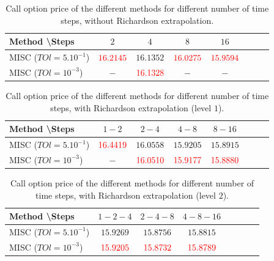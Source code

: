 \documentclass[11pt]{article}
\begin{document}
\begin{table}[h!]
	\centering
	\begin{tabular}{l*{6}{c}r}
		Method \textbackslash  Steps            & $2$ & $4$ & $8$ & $16$ &   \\
		\hline
		MISC ($TOl=5.10^{-1}$)  & ${\color{red}16.2145}$ & $16.1352$ & ${\color{red}16.0275}$ & ${\color{red}15.9594}$  \\
			MISC ($TOl=10^{-3}$)  & $-$ & $ {\color{red}16.1328 }$ & $-$ & $-$  \\
		\hline
	\end{tabular}
	\caption{ Call option price of the different methods for different number of time steps, without Richardson extrapolation.}
	\label{table: Call option price of the different methods for different number of time steps}
\end{table}


\begin{table}[h!]
	\centering
	\begin{tabular}{l*{6}{c}r}
		Method \textbackslash  Steps   &$1-2$         & $2-4$ & $4-8$ & $8-16$  \\
		\hline
		MISC ($TOl=5.10^{-1}$) & ${\color{red}16.4419}$ & $16.0558$ & $15.9205$ & $15.8915$   \\
		MISC ($TOl=10^{-3}$) & $-$ & ${\color{red}16.0510}$ & $ {\color{red}15.9177}$ & ${\color{red}15.8880}$   \\
		\hline
	\end{tabular}
	\caption{Call  option price of the different methods for different number of time steps, with Richardson extrapolation (level $1$).}
	\label{table: Call option price of the different methods for different number of time steps, binary option, with richardson, level 1}
\end{table}

\begin{table}[h!]
	\centering
	\begin{tabular}{l*{6}{c}r}
		Method \textbackslash  Steps   &$1-2-4$         & $2-4-8$ & $4-8-16$   \\
		\hline
		MISC ($TOl=5.10^{-1}$) & $15.9269$ & $15.8756$ & $15.8815$  \\
		MISC ($TOl=10^{-3}$) & ${\color{red}15.9205}$ & ${\color{red}15.8732}$ & $ {\color{red}  15.8789}$   \\
		\hline
	\end{tabular}
	\caption{Call option price of the different methods for different number of time steps, with Richardson extrapolation (level $2$).}
	\label{table: Call option price of the different methods for different number of time steps, binary option, with richardson, level 2}
\end{table}
\newpage
\end{document}
